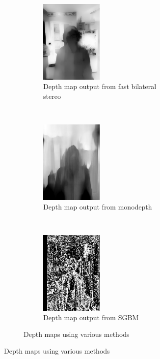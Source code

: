 \documentclass[10pt,twocolumn,letterpaper]{article}
\begin{document}
\begin{figure}[t!]
    \begin{subfigure}[t!]{\textwidth}
        \centering
        \begin{subfigure}[t!]{0.33\textwidth}
            \centering
            \includegraphics[width=1.2in]{bin/depth_map_FBIL.jpg}
            \caption{Depth map output from fast bilateral stereo}
        \end{subfigure}%
        ~
        \begin{subfigure}[t!]{0.33\textwidth}
            \centering
            \includegraphics[width=1.2in]{bin/depth_map_monodepth.jpg}
            \caption{Depth map output from monodepth}
        \end{subfigure}%
        ~
        \begin{subfigure}[t!]{0.33\textwidth}
            \centering
            \includegraphics[width=1.2in]{bin/depth_map2_SGBM.jpg}
            \caption{Depth map output from SGBM}
        \end{subfigure}
        \caption*{Depth maps using various methods}
    \end{subfigure}


\end{figure}
\end{document}
